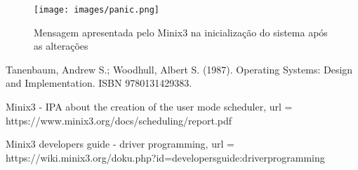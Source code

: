 \documentclass[journal]{IEEEtran}
\begin{document}
\begin{figure}[H]
    \centering
    \texttt{[image: images/panic.png]}
    \caption{Mensagem apresentada pelo Minix3 na inicialização do sistema após as alterações}
    \label{fig:panic}
\end{figure}

\begin{thebibliography}{1}

\bibitem{}
Tanenbaum, Andrew S.; Woodhull, Albert S. (1987). Operating Systems: Design and Implementation. ISBN 9780131429383.

\bibitem{}
Minix3 - IPA about the creation of the user mode scheduler, url = https://www.minix3.org/docs/scheduling/report.pdf

\bibitem{}
  Minix3 developers guide - driver programming, url = https://wiki.minix3.org/doku.php?id=developersguide:driverprogramming 

\end{thebibliography}
\end{document}
